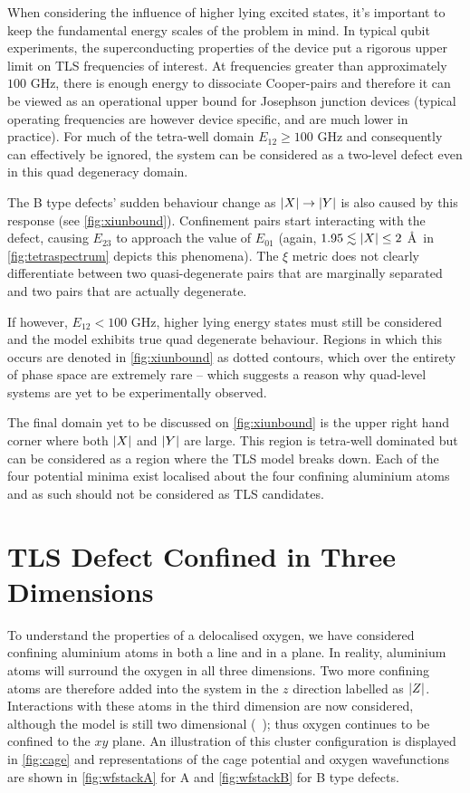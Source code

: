 When considering the influence of higher lying excited states, it's important to keep the fundamental energy scales of the problem in mind.
In typical qubit experiments, the superconducting properties of the device put a rigorous upper limit on TLS frequencies of interest.
At frequencies greater than approximately $100$ GHz, there is enough energy to dissociate Cooper-pairs and therefore it can be viewed as an operational upper bound for Josephson junction devices (typical operating frequencies are however device specific, and are much lower in practice).
For much of the tetra-well domain $E_{12} \geq 100$ GHz and consequently can effectively be ignored, the system can be considered as a two-level defect even in this quad degeneracy domain.

The B type defects' sudden behaviour change as $\lvert X\rvert\rightarrow\lvert Y\rvert$ is also caused by this response (see \cref{fig:xiunbound}).
Confinement pairs start interacting with the defect, causing $E_{23}$ to approach the value of $E_{01}$ (again, $1.95 \lesssim \lvert X\rvert \leq 2$ \AA\ in \cref{fig:tetraspectrum} depicts this phenomena).
The $\xi$ metric does not clearly differentiate between two quasi-degenerate pairs that are marginally separated and two pairs that are actually degenerate.

If however, $E_{12} < 100$ GHz, higher lying energy states must still be considered and the model exhibits true quad degenerate behaviour.
Regions in which this occurs are denoted in \cref{fig:xiunbound} as dotted contours, which over the entirety of phase space are extremely rare -- which suggests a reason why quad-level systems are yet to be experimentally observed.

The final domain yet to be discussed on \cref{fig:xiunbound} is the upper right hand corner where both $\lvert X\rvert$ and $\lvert Y\rvert$ are large.
This region is tetra-well dominated but can be considered as a region where the TLS model breaks down.
Each of the four potential minima exist localised about the four confining aluminium atoms and as such should not be considered as TLS candidates.

\section{TLS Defect Confined in Three Dimensions}\label{sec:tls}

To understand the properties of a delocalised oxygen, we have considered confining aluminium atoms in both a line and in a plane.
In reality, aluminium atoms will surround the oxygen in all three dimensions.
Two more confining atoms are therefore added into the system in the $z$ direction labelled as $\lvert Z\rvert$.
Interactions with these atoms in the third dimension are now considered, although the model is still two dimensional (\ie\ ); thus oxygen continues to be confined to the $xy$ plane.
An illustration of this cluster configuration is displayed in \cref{fig:cage} and representations of the cage potential and oxygen wavefunctions are shown in \cref{fig:wfstackA} for A and \cref{fig:wfstackB} for B type defects.

